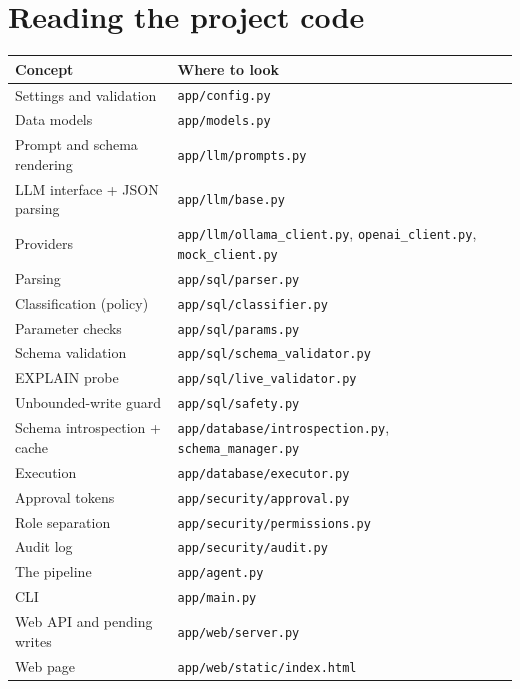 \documentclass[11pt,a4paper]{article}
\begin{document}
\section{Reading the project code}

\begin{center}
\begin{tabular}{@{}p{5.2cm}p{9.4cm}@{}}
\toprule
\textbf{Concept} & \textbf{Where to look} \\
\midrule
Settings and validation       & \texttt{app/config.py} \\
Data models                   & \texttt{app/models.py} \\
Prompt and schema rendering   & \texttt{app/llm/prompts.py} \\
LLM interface + JSON parsing  & \texttt{app/llm/base.py} \\
Providers                     & \texttt{app/llm/ollama\_client.py}, \texttt{openai\_client.py}, \texttt{mock\_client.py} \\
Parsing                       & \texttt{app/sql/parser.py} \\
Classification (policy)       & \texttt{app/sql/classifier.py} \\
Parameter checks              & \texttt{app/sql/params.py} \\
Schema validation             & \texttt{app/sql/schema\_validator.py} \\
EXPLAIN probe                 & \texttt{app/sql/live\_validator.py} \\
Unbounded-write guard         & \texttt{app/sql/safety.py} \\
Schema introspection + cache  & \texttt{app/database/introspection.py}, \texttt{schema\_manager.py} \\
Execution                     & \texttt{app/database/executor.py} \\
Approval tokens               & \texttt{app/security/approval.py} \\
Role separation               & \texttt{app/security/permissions.py} \\
Audit log                     & \texttt{app/security/audit.py} \\
The pipeline                  & \texttt{app/agent.py} \\
CLI                           & \texttt{app/main.py} \\
Web API and pending writes    & \texttt{app/web/server.py} \\
Web page                      & \texttt{app/web/static/index.html} \\
\bottomrule
\end{tabular}
\end{center}
\end{document}
